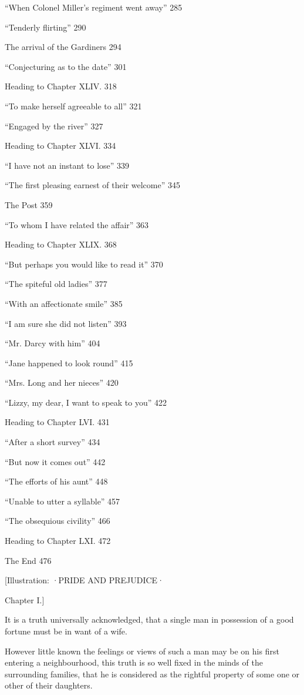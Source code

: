 \documentclass[12pt]{book}
\begin{document}
``When Colonel Miller's regiment went away'' 285

``Tenderly flirting'' 290

The arrival of the Gardiners 294

``Conjecturing as to the date'' 301

Heading to Chapter XLIV. 318

``To make herself agreeable to all'' 321

``Engaged by the river'' 327

Heading to Chapter XLVI. 334

``I have not an instant to lose'' 339

``The first pleasing earnest of their welcome'' 345

The Post 359

``To whom I have related the affair'' 363

Heading to Chapter XLIX. 368

``But perhaps you would like to read it'' 370

``The spiteful old ladies'' 377

``With an affectionate smile'' 385

``I am sure she did not listen'' 393

``Mr. Darcy with him'' 404

``Jane happened to look round'' 415

``Mrs. Long and her nieces'' 420

``Lizzy, my dear, I want to speak to you'' 422

Heading to Chapter LVI. 431

``After a short survey'' 434

``But now it comes out'' 442

``The efforts of his aunt'' 448

``Unable to utter a syllable'' 457

``The obsequious civility'' 466

Heading to Chapter LXI. 472

The End 476

[Illustration: ·PRIDE AND PREJUDICE·

Chapter I.]

It is a truth universally acknowledged, that a single man in possession of a good fortune must be in want of a wife.

However little known the feelings or views of such a man may be on his first entering a neighbourhood, this truth is so well fixed in the minds of the surrounding families, that he is considered as the rightful property of some one or other of their daughters.
\end{document}
